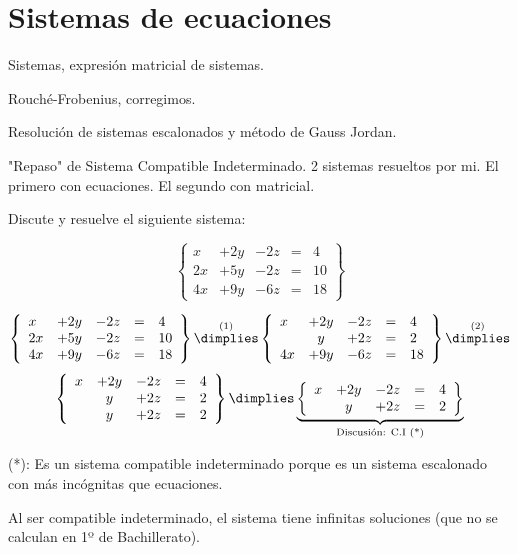 \section{Sistemas de ecuaciones}

Sistemas, expresión matricial de sistemas. 
 
Rouché-Frobenius, corregimos. 

Resolución de sistemas escalonados y método de Gauss Jordan.
 
"Repaso" de Sistema Compatible Indeterminado. 2 sistemas resueltos por mi. El primero con ecuaciones. El segundo con matricial.


\begin{problem}

Discute y resuelve el siguiente sistema:

\[
\left\{\begin{array}{lcccl}
x&+2y&-2z&=&4\\
2x&+5y&-2z&=&10\\
4x&+9y&-6z&=&18
\end{array}\right\}
\]

\solution

\[
\left\{\begin{array}{lcccl}
x&+2y&-2z&=&4\\
2x&+5y&-2z&=&10\\
4x&+9y&-6z&=&18
\end{array}\right\}
\overset{(1)}{\dimplies}
\left\{\begin{array}{lcccl}
x&+2y&-2z&=&4\\
 &y&+2z&=&2 \\
4x&+9y&-6z&=&18
\end{array}\right\}
\overset{(2)}{\dimplies}\]
\[
\left\{\begin{array}{lcccl}
x&+2y&-2z&=&4\\
 &y&+2z&=&2 \\
 &y&+2z&=&2 \\
\end{array}\right\}
\dimplies
\underbrace{\left\{\begin{array}{lcccl}
x&+2y&-2z&=&4\\
 &y&+2z&=&2 
\end{array}\right\}}_{\text{Discusión: C.I (*)}}
\]

(*): Es un sistema compatible indeterminado porque es un sistema escalonado con más incógnitas que ecuaciones.

Al ser compatible indeterminado, el sistema tiene infinitas soluciones (que no se calculan en 1º de Bachillerato).



\end{problem}
